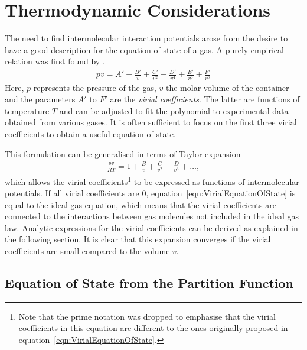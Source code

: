 \section{Thermodynamic Considerations}
\label{sec:ThermodynamicConsiderations}

The need to find intermolecular interaction potentials arose from the desire to
have a good description for the equation of state of a gas. A purely empirical
relation was first found by
\citeauthor{KamerlinghOnnes_Expressionequationstate_1902}.\autocite{KamerlinghOnnes_Expressionequationstate_1902}
%
\begin{align}
    pv=A'+\frac{B'}{v}+\frac{C'}{v^2}+\frac{D'}{v^4}+\frac{E'}{v^6}+\frac{F'}{v^8}
\end{align}
%
Here, $p$ represents the pressure of the gas, $v$ the molar volume of the
container and the parameters $A'$ to $F'$ are the \textit{virial coefficients}.
The latter are functions of temperature $T$ and can be adjusted to fit the
polynomial to experimental data obtained from various gases. It is often
sufficient to focus on the first three virial coefficients to obtain a useful
equation of state. 

This formulation can be generalised in terms of Taylor expansion
%
\begin{align}
    \frac{pv}{RT}=1+\frac{B}{v}+\frac{C}{v^2}+\frac{D}{v^3}+\dots,\label{eqn:VirialEquationOfState}
\end{align}
%
which allows the virial coefficients\footnote{Note that the prime notation was
dropped to emphasise that the virial coefficients in this equation are different
to the ones originally proposed in equation~\eqref{eqn:VirialEquationOfState}.}
to be expressed as functions of intermolecular potentials. If all virial
coefficients are 0, equation~\eqref{eqn:VirialEquationOfState} is equal to the
ideal gas equation, which means that the virial coefficients are connected to
the interactions between gas molecules not included in the ideal gas law.
Analytic expressions for the virial coefficients can be derived as explained in
the following section. It is clear that this expansion converges if the virial
coefficients are small compared to the volume $v$.

\subsection{Equation of State from the Partition Function}
\label{sec:equationofstatefromthepartitionfunction}

